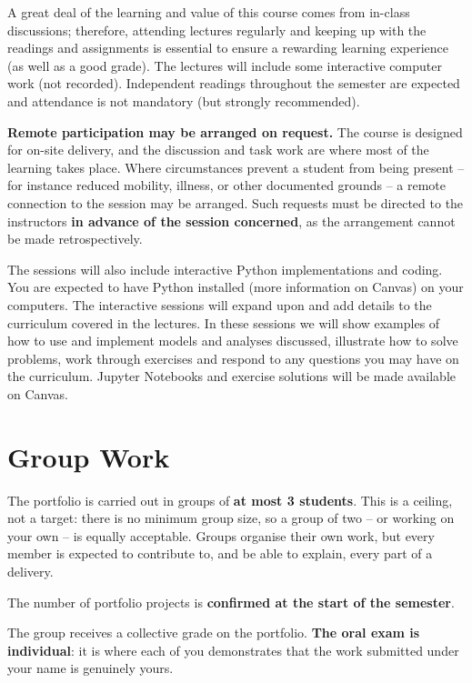 \documentclass[letterpaper,12pt,oneside]{article}
\newcommand{\maxgroupsize}{3}          %
\begin{document}
A great deal of the learning and value of this course comes from in-class discussions; therefore, attending lectures regularly and keeping up with the readings and assignments is essential to ensure a rewarding learning experience (as well as a good grade). The lectures will include some interactive computer work (not recorded). Independent readings throughout the semester are expected and attendance is not mandatory (but strongly recommended).

\textbf{Remote participation may be arranged on request.} The course is designed for on-site delivery, and the discussion and task work are where most of the learning takes place. Where circumstances prevent a student from being present -- for instance reduced mobility, illness, or other documented grounds -- a remote connection to the session may be arranged. Such requests must be directed to the instructors \textbf{in advance of the session concerned}, as the arrangement cannot be made retrospectively.

The sessions will also include interactive Python implementations and coding. You are expected to have Python installed (more information on Canvas) on your computers. The interactive sessions will expand upon and add details to the curriculum covered in the lectures. In these sessions we will show examples of how to use and implement models and analyses discussed, illustrate how to solve problems, work through exercises and respond to any questions you may have on the curriculum. Jupyter Notebooks and exercise solutions will be made available on Canvas.

\section*{Group Work}

The portfolio is carried out in groups of \textbf{at most \maxgroupsize{} students}. This is a ceiling, not a target: there is no minimum group size, so a group of two -- or working on your own -- is equally acceptable. Groups organise their own work, but every member is expected to contribute to, and be able to explain, every part of a delivery.

The number of portfolio projects is \textbf{confirmed at the start of the semester}.

The group receives a collective grade on the portfolio. \textbf{The oral exam is individual}: it is where each of you demonstrates that the work submitted under your name is genuinely yours.
\end{document}
